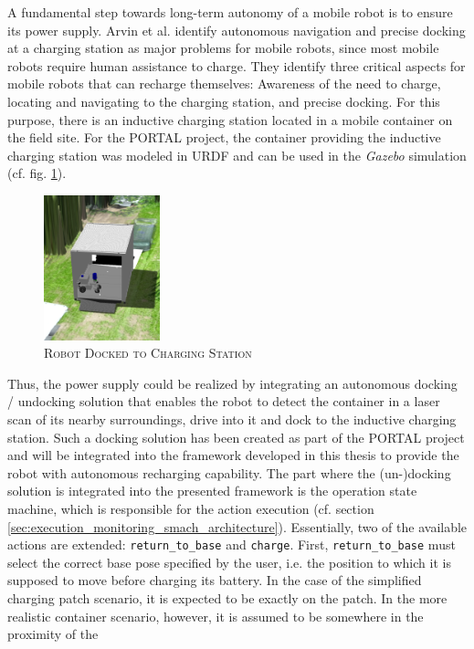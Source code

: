 \documentclass[english, master, utf8]{base/thesis_KBS}
\newcommand{\code}[1]{\colorbox{light-gray}{\texttt{#1}}}
\begin{document}
A fundamental step towards long-term autonomy of a mobile robot is to ensure its power supply. Arvin et al. \cite{Arvin:2009} identify autonomous navigation and precise docking at
a charging station as major problems for mobile robots, since most mobile robots require human assistance to charge. They identify three critical aspects for mobile robots that can
recharge themselves: Awareness of the need to charge, locating and navigating to the charging station, and precise docking. For this purpose, there is an inductive charging station
located in a mobile container on the field site. For the PORTAL project, the container providing the inductive charging station was modeled in URDF and can be used in the \textit{Gazebo} simulation (cf.
fig. \ref{fig:container_model}).
\begin{figure}[H]
    \centering
    \includegraphics[width=0.3\textwidth]{pics/docked.png}
    \caption{\textsc{Robot Docked to Charging Station}}
    \label{fig:container_model}
\end{figure}
Thus, the power supply could be realized by integrating an autonomous docking / undocking solution that enables the robot to detect the container in a laser scan of its nearby
surroundings, drive into it and dock to the inductive charging station. Such a docking solution has been created as part of the PORTAL project and will be integrated into the
framework developed in this thesis to provide the robot with autonomous recharging capability. The part where the (un-)docking solution is integrated into the presented framework is
the operation state machine, which is responsible for the action execution (cf. section \ref{sec:execution_monitoring_smach_architecture}). Essentially, two of the available actions are extended: \code{return\_to\_base} and \code{charge}. First,
\code{return\_to\_base} must select the correct base pose specified by the user, i.e. the position to which it is supposed to move before charging its battery. In the case of the
simplified charging patch scenario, it is expected to be exactly on the patch. In the more realistic container scenario, however, it is assumed to be somewhere in the proximity of the
\end{document}
